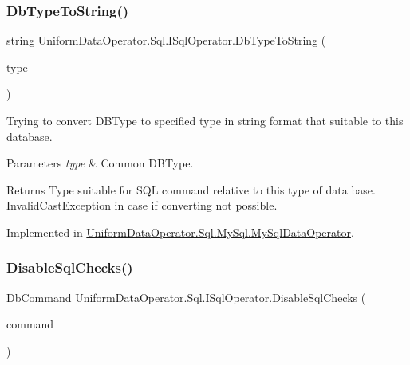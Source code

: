 \mbox{\label{interface_uniform_data_operator_1_1_sql_1_1_i_sql_operator_a51af40df39808d53cdcc81852b836634}} 
\subsubsection{\texorpdfstring{Db\+Type\+To\+String()}{DbTypeToString()}}
{\footnotesize\ttfamily string Uniform\+Data\+Operator.\+Sql.\+I\+Sql\+Operator.\+Db\+Type\+To\+String (\begin{DoxyParamCaption}\item[{Db\+Type}]{type }\end{DoxyParamCaption})}



Trying to convert D\+B\+Type to specified type in string format that suitable to this database. 


\begin{DoxyParams}{Parameters}
{\em type} & Common D\+B\+Type.\\
\hline
\end{DoxyParams}
\begin{DoxyReturn}{Returns}
Type suitable for S\+QL command relative to this type of data base. Invalid\+Cast\+Exception in case if converting not possible.
\end{DoxyReturn}


Implemented in \mbox{\hyperlink{class_uniform_data_operator_1_1_sql_1_1_my_sql_1_1_my_sql_data_operator_a7b854ebbcdf31c67716d8c365c321a31}{Uniform\+Data\+Operator.\+Sql.\+My\+Sql.\+My\+Sql\+Data\+Operator}}.

\mbox{\label{interface_uniform_data_operator_1_1_sql_1_1_i_sql_operator_a12d464e0532a3e194b1221eee0c32d34}} 
\subsubsection{\texorpdfstring{Disable\+Sql\+Checks()}{DisableSqlChecks()}\hspace{0.1cm}{\footnotesize\ttfamily [1/2]}}
{\footnotesize\ttfamily Db\+Command Uniform\+Data\+Operator.\+Sql.\+I\+Sql\+Operator.\+Disable\+Sql\+Checks (\begin{DoxyParamCaption}\item[{Db\+Command}]{command }\end{DoxyParamCaption})}




